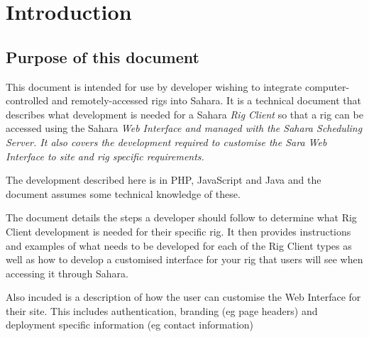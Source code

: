 \chapter{Introduction} 
\section{Purpose of this document}

This document is intended for use by developer wishing to integrate computer-controlled and remotely-accessed rigs into Sahara.  
It is a technical document that describes what development is needed for a Sahara {\em Rig Client} so that a rig can be accessed using the Sahara \em{Web Interface} and managed with the Sahara \em{Scheduling Server}.  It also covers the development required to customise the Sara Web Interface to site and rig specific requirements. 

The development described here is in PHP, JavaScript and Java and the document assumes some technical knowledge of these.

The document details the steps a developer should follow to determine what Rig Client development is needed for their specific rig.  It then provides instructions and examples of what needs to be developed for each of the Rig Client types as well as how to develop a customised interface for your rig that users will see when accessing it through Sahara.

Also incuded is a description of how the user can customise the Web Interface for their site.  This includes authentication, branding (eg page headers) and deployment specific information (eg contact information)



